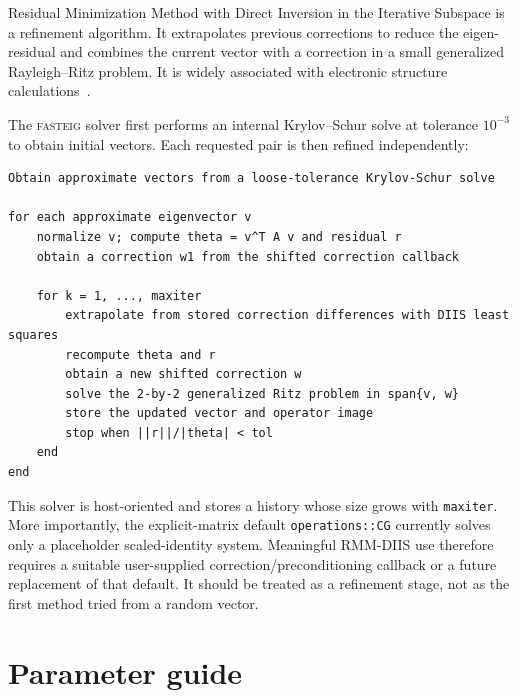 \documentclass[11pt]{article}
\newcommand{\fasteig}{\textsc{fasteig}}
\newcommand{\code}[1]{\texttt{#1}}
\begin{document}
Residual Minimization Method with Direct Inversion in the Iterative Subspace
is a refinement algorithm.  It extrapolates previous corrections to reduce the
eigen-residual and combines the current vector with a correction in a small
generalized Rayleigh--Ritz problem.  It is widely associated with electronic
structure calculations~\cite{kresse}.

The \fasteig{} solver first performs an internal Krylov--Schur solve at tolerance
$10^{-3}$ to obtain initial vectors.  Each requested pair is then refined
independently:

\begin{lstlisting}
Obtain approximate vectors from a loose-tolerance Krylov-Schur solve

for each approximate eigenvector v
    normalize v; compute theta = v^T A v and residual r
    obtain a correction w1 from the shifted correction callback

    for k = 1, ..., maxiter
        extrapolate from stored correction differences with DIIS least squares
        recompute theta and r
        obtain a new shifted correction w
        solve the 2-by-2 generalized Ritz problem in span{v, w}
        store the updated vector and operator image
        stop when ||r||/|theta| < tol
    end
end
\end{lstlisting}

This solver is host-oriented and stores a history whose size grows with
\code{maxiter}.  More importantly, the explicit-matrix default
\code{operations::CG} currently solves only a placeholder scaled-identity
system.  Meaningful RMM-DIIS use therefore requires a suitable user-supplied
correction/preconditioning callback or a future replacement of that default.
It should be treated as a refinement stage, not as the first method tried from
a random vector.

\section{Parameter guide}
\label{sec:parameters}
\end{document}
